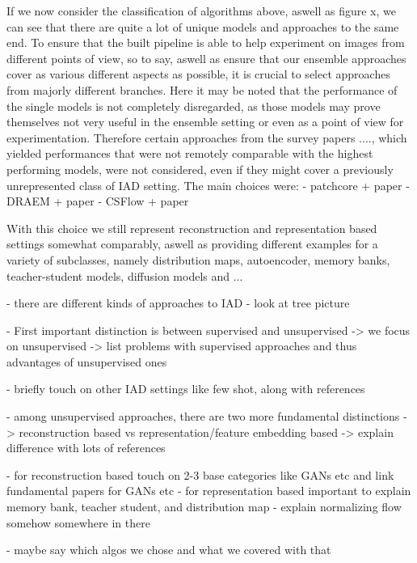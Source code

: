 If we now consider the classification of algorithms above, aswell as figure x, we can see that there are quite a lot of unique models and approaches to the same end. To ensure that the built 
pipeline is able to help experiment on images from different points of view, so to say, aswell as ensure that our ensemble approaches cover as various different aspects as possible, it is 
crucial to select approaches from majorly different branches. Here it may be noted that the performance of the single models is not completely disregarded, as those models may prove themselves 
not very useful in the ensemble setting or even as a point of view for experimentation. Therefore certain approaches from the survey papers ...., which yielded performances that were not 
remotely comparable with the highest performing models, were not considered, even if they might cover a previously unrepresented class of IAD setting. 
The main choices were:
- patchcore + paper
- DRAEM + paper
- CSFlow + paper

With this choice we still represent reconstruction and representation based settings somewhat comparably, aswell as providing different examples for a variety of subclasses, namely
distribution maps, autoencoder, memory banks, teacher-student models, diffusion models and ...



- there are different kinds of approaches to IAD
- look at tree picture
 
- First important distinction is between supervised and unsupervised
-> we focus on unsupervised
-> list problems with supervised approaches and thus advantages of unsupervised ones

- briefly touch on other IAD settings like few shot, along with references

- among unsupervised approaches, there are two more fundamental distinctions
-> reconstruction based vs representation/feature embedding based
-> explain difference with lots of references

- for reconstruction based touch on 2-3 base categories like GANs etc and link fundamental papers for GANs etc
- for representation based important to explain memory bank, teacher student, and distribution map
- explain normalizing flow somehow somewhere in there

- maybe say which algos we chose and what we covered with that




